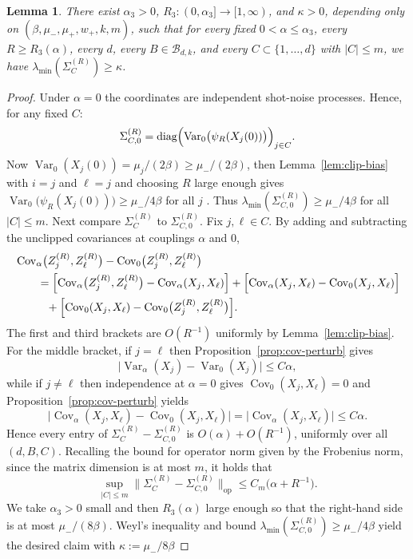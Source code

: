 \documentclass{article}
\newtheorem{lemma}{Lemma}[section]
\newcommand{\Cov}{\operatorname{Cov}}
\newcommand{\Var}{\operatorname{Var}}
\newcommand{\norm}[1]{\lVert #1\rVert}
\newcommand{\abs}[1]{\lvert #1\rvert}
\newcommand{\op}{\mathrm{op}}
\begin{document}
\begin{lemma}
\label{lem:Gram-nondeg}
There exist $\alpha_3>0$, $R_3:(0,\alpha_3]\to[1,\infty)$, and $\kappa>0$, depending only on $(\beta,\mu_-,\mu_+,w_+,k,m)$, such that for every fixed $0<\alpha\le \alpha_3$, every $R\ge R_3(\alpha)$, every $d$, every $B\in\mathcal B_{d,k}$, and every $C\subset\{1,\dots,d\}$ with $|C|\le m$, we have $\lambda_{\min}(\Sigma_C^{(R)})\ge \kappa$.
\end{lemma}
\begin{proof}
Under $\alpha=0$ the coordinates are independent shot-noise processes. Hence, for any fixed $C$:
\[
\Sigma_{C,0}^{(R)} = \text{diag}\Bigl(\Var_0\bigl(\psi_R(X_j(0))\bigr)\Bigr)_{j\in C}.
\]
Now $\Var_0(X_j(0))=\mu_j/(2\beta)\ge \mu_-/(2\beta)$, then Lemma~\ref{lem:clip-bias} with $i=j$ and $\ell=j$ and choosing $R$ large enough gives
$\Var_0\bigl(\psi_R(X_j(0))\bigr)\ge \mu_-/4\beta$ for all $j$ . Thus $\lambda_{\min}(\Sigma_{C,0}^{(R)})\ge \mu_-/4\beta$ for all $|C|\le m$.
Next compare $\Sigma_C^{(R)}$ to $\Sigma_{C,0}^{(R)}$. Fix $j,\ell\in C$. By adding and subtracting the unclipped covariances at couplings $\alpha$ and $0$,
\begin{align*}
&\Cov_\alpha\bigl(Z_j^{(R)},Z_\ell^{(R)}\bigr)-\Cov_0\bigl(Z_j^{(R)},Z_\ell^{(R)}\bigr) \\
&\qquad= \Bigl[\Cov_\alpha\bigl(Z_j^{(R)},Z_\ell^{(R)}\bigr)-\Cov_\alpha(X_j,X_\ell)\Bigr]
+ \Bigl[\Cov_\alpha(X_j,X_\ell)-\Cov_0(X_j,X_\ell)\Bigr] \\
&\qquad\phantom{=}+ \Bigl[\Cov_0(X_j,X_\ell)-\Cov_0\bigl(Z_j^{(R)},Z_\ell^{(R)}\bigr)\Bigr].
\end{align*}
The first and third brackets are $O(R^{-1})$ uniformly by Lemma~\ref{lem:clip-bias}. For the middle bracket, if $j=\ell$ then Proposition~\ref{prop:cov-perturb} gives
\[
\abs{\Var_\alpha(X_j)-\Var_0(X_j)}\le C\alpha,
\]
while if $j\neq \ell$ then independence at $\alpha=0$ gives $\Cov_0(X_j,X_\ell)=0$ and Proposition~\ref{prop:cov-perturb} yields
\[
\abs{\Cov_\alpha(X_j,X_\ell)-\Cov_0(X_j,X_\ell)}=\abs{\Cov_\alpha(X_j,X_\ell)}\le C\alpha.
\]
Hence every entry of $\Sigma_C^{(R)}-\Sigma_{C,0}^{(R)}$ is $O(\alpha)+O(R^{-1})$, uniformly over all $(d,B,C)$. Recalling the bound for operator norm given by the Frobenius norm, since the matrix dimension is at most $m$, it holds that
\[
\sup_{|C|\le m}\norm{\Sigma_C^{(R)}-\Sigma_{C,0}^{(R)}}_\op
\le C_m\bigl(\alpha+R^{-1}\bigr).
\]
We take $\alpha_3>0$ small and then $R_3(\alpha)$ large enough so that the right-hand side is at most $\mu_-/(8\beta)$. Weyl's inequality and bound $\lambda_{\min}(\Sigma_{C,0}^{(R)})\ge \mu_-/4\beta$ yield the desired claim with $\kappa:=\mu_-/8\beta$
\end{proof}
\end{document}
